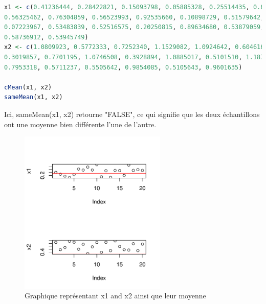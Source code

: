 \begin{lstlisting}[language=R]
x1 <- c(0.41236444, 0.28422821, 0.15093798, 0.05885328, 0.25514435, 0.63026931,
0.56325462, 0.76304859, 0.56523993, 0.92535660, 0.10898729, 0.51579642,
0.07223967, 0.53483839, 0.52516575, 0.20250815, 0.89634680, 0.53879059,
0.58736912, 0.53945749)
x2 <- c(1.0809923, 0.5772333, 0.7252340, 1.1529082, 1.0924642, 0.6046166, 0.9495800,
0.3019857, 0.7701195, 1.0746508, 0.3928894, 1.0885017, 0.5101510, 1.1871599,
0.7953318, 0.5711237, 0.5505642, 0.9854085, 0.5105643, 0.9601635)

cMean(x1, x2)
sameMean(x1, x2)
\end{lstlisting}

Ici, sameMean(x1, x2) retourne "FALSE", ce qui signifie que les deux échantillons ont une moyenne bien différente l'une de l'autre.

\begin{figure}[H]
	\begin{center}
		\includegraphics[width=7cm]{diagrams/x1-x2-2.pdf}
		\caption{Graphique représentant x1 and x2 ainsi que leur moyenne}
		\label{fig:x1-x2-2}
	\end{center}
\end{figure}


